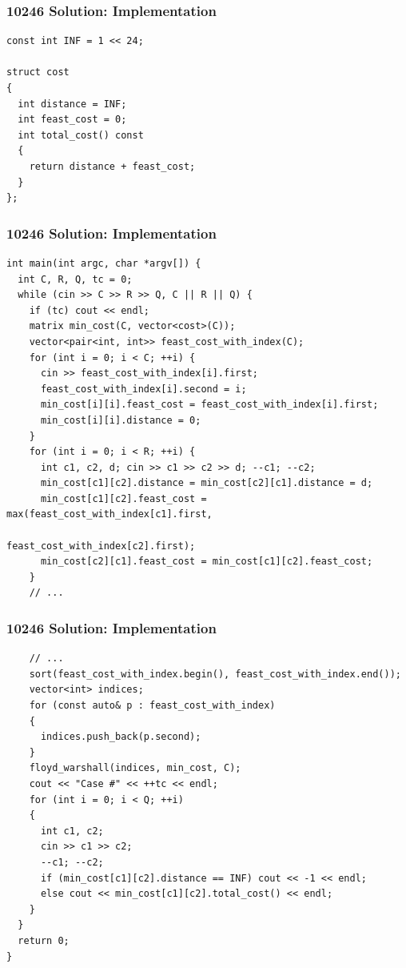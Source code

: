 \documentclass{beamer}
\begin{document}
\begin{frame}[containsverbatim]
\frametitle{10246 Solution: Implementation}

\scriptsize
\begin{lstlisting}
const int INF = 1 << 24;

struct cost
{
  int distance = INF;
  int feast_cost = 0;
  int total_cost() const
  {
    return distance + feast_cost;
  }
};
\end{lstlisting}

\end{frame}

\begin{frame}[containsverbatim]
\frametitle{10246 Solution: Implementation}

\scriptsize
\begin{lstlisting}
int main(int argc, char *argv[]) {
  int C, R, Q, tc = 0;
  while (cin >> C >> R >> Q, C || R || Q) {
    if (tc) cout << endl;
    matrix min_cost(C, vector<cost>(C));
    vector<pair<int, int>> feast_cost_with_index(C);
    for (int i = 0; i < C; ++i) {
      cin >> feast_cost_with_index[i].first;
      feast_cost_with_index[i].second = i;
      min_cost[i][i].feast_cost = feast_cost_with_index[i].first;
      min_cost[i][i].distance = 0;
    }
    for (int i = 0; i < R; ++i) {
      int c1, c2, d; cin >> c1 >> c2 >> d; --c1; --c2;
      min_cost[c1][c2].distance = min_cost[c2][c1].distance = d;
      min_cost[c1][c2].feast_cost = max(feast_cost_with_index[c1].first,
                                      feast_cost_with_index[c2].first);
      min_cost[c2][c1].feast_cost = min_cost[c1][c2].feast_cost;
    }
    // ...
\end{lstlisting}

\end{frame}

\begin{frame}[containsverbatim]
\frametitle{10246 Solution: Implementation}

\scriptsize
\begin{lstlisting}
    // ...
    sort(feast_cost_with_index.begin(), feast_cost_with_index.end());
    vector<int> indices;
    for (const auto& p : feast_cost_with_index)
    {
      indices.push_back(p.second);
    }
    floyd_warshall(indices, min_cost, C);
    cout << "Case #" << ++tc << endl;
    for (int i = 0; i < Q; ++i)
    {
      int c1, c2;
      cin >> c1 >> c2;
      --c1; --c2;
      if (min_cost[c1][c2].distance == INF) cout << -1 << endl;
      else cout << min_cost[c1][c2].total_cost() << endl;
    }
  }
  return 0;
}
\end{lstlisting}

\end{frame}
\end{document}

